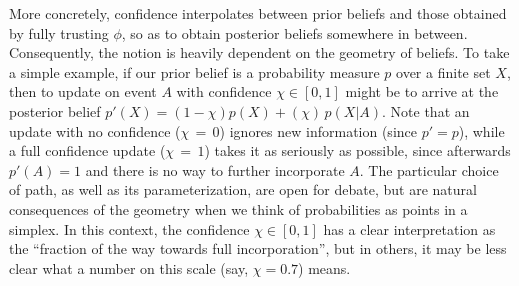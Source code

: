 More concretely, confidence interpolates between prior beliefs and those obtained by fully trusting $\phi$, so as to obtain posterior beliefs somewhere in between. 
Consequently, the notion is heavily dependent on the geometry of beliefs.
To take a simple example,
if our prior belief is a probability measure $p$ over a finite set $X$, then to update on event $A$ with confidence $\chi \in [0,1]$ might be to arrive at the posterior belief $p'(X) = (1-\chi) p(X) + (\chi)\, p(X|A)$. 
Note that 
an update with no confidence ($\chi{\,=\,}0$) ignores new information (since $p' \!=\! p$),
while a
full confidence update ($\chi{\,=\,}1$) takes it as seriously as possible,
since afterwards $p'(A) \!=\! 1$ and there is no way to further incorporate $A$.
%
%
The particular choice of path, as well as its parameterization,
are open for debate, but are natural consequences of the geometry when we think of probabilities as points in a simplex.
%
In this context, 
the confidence $\chi \in [0,1]$ has a clear interpretation as the ``fraction of the way towards full incorporation'',
but in others,
it may be 
less clear what a number on this scale (say, $\chi{=}0.7$) means.

